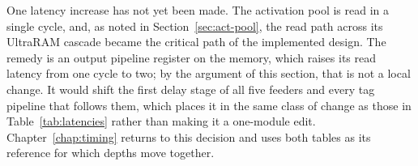 One latency increase has not yet been made. The activation pool is read in a
single cycle, and, as noted in Section~\ref{sec:act-pool}, the read path across
its UltraRAM cascade became the critical path of the implemented design. The
remedy is an output pipeline register on the memory, which raises its read
latency from one cycle to two; by the argument of this section, that is not a
local change. It would shift the first delay stage of all five feeders and every
tag pipeline that follows them, which places it in the same class of change as
those in Table~\ref{tab:latencies} rather than making it a one-module edit.
Chapter~\ref{chap:timing} returns to this decision and uses both tables as its
reference for which depths move together.
